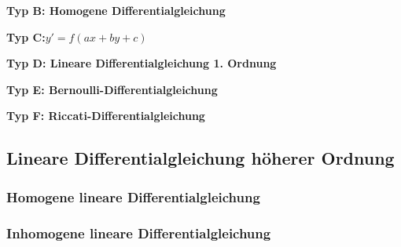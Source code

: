 \textbf{Typ B: Homogene Differentialgleichung}


\textbf{Typ C:$y' = f(ax+by+c)$}

\textbf{Typ D: Lineare Differentialgleichung 1. Ordnung}

\textbf{Typ E: Bernoulli-Differentialgleichung}

\textbf{Typ F: Riccati-Differentialgleichung}

\subsection*{Lineare Differentialgleichung h\"oherer Ordnung}

\subsubsection*{Homogene lineare Differentialgleichung}

\subsubsection*{Inhomogene lineare Differentialgleichung}